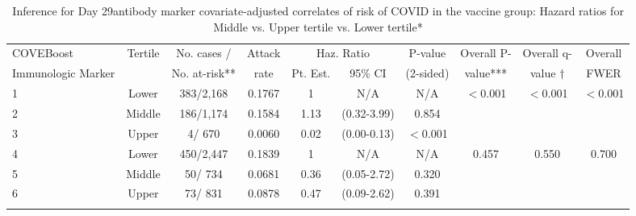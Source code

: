 \begin{longtable}{lccccccccc}
\caption{Inference for Day 29antibody marker covariate-adjusted correlates of risk of COVID in the vaccine group: Hazard ratios for Middle vs. Upper tertile vs. Lower tertile*} \\ 
   \hline
 
         \multicolumn{1}{l}{COVEBoost} & \multicolumn{1}{c}{Tertile}   & \multicolumn{1}{c}{No. cases /}   & \multicolumn{1}{c}{Attack}   & \multicolumn{2}{c}{Haz. Ratio}                     & \multicolumn{1}{c}{P-value}   & \multicolumn{1}{c}{Overall P-}      & \multicolumn{1}{c}{Overall q-}   & \multicolumn{1}{c}{Overall} \\ 
         \multicolumn{1}{l}{Immunologic Marker}            & \multicolumn{1}{c}{}          & \multicolumn{1}{c}{No. at-risk**} & \multicolumn{1}{c}{rate}   & \multicolumn{1}{c}{Pt. Est.} & \multicolumn{1}{c}{95\% CI} & \multicolumn{1}{c}{(2-sided)} & \multicolumn{1}{c}{value***} & \multicolumn{1}{c}{value $\dagger$} & \multicolumn{1}{c}{FWER} \\ 
         \hline
 
    1 & Lower & 383/2,168 & 0.1767 & 1 & N/A & N/A & $<$0.001 & $<$0.001 & $<$0.001 \\ 
  2 & Middle & 186/1,174 & 0.1584 & 1.13 & (0.32-3.99) & 0.854 &     &  &  \\ 
  3 & Upper & 4/  670 & 0.0060 & 0.02 & (0.00-0.13) & $<$0.001 &     &  &  \\ 
  4 & Lower & 450/2,447 & 0.1839 & 1 & N/A & N/A & 0.457 & 0.550 & 0.700 \\ 
  5 & Middle & 50/  734 & 0.0681 & 0.36 & (0.05-2.72) & 0.320 &     &  &  \\ 
  6 & Upper & 73/  831 & 0.0878 & 0.47 & (0.09-2.62) & 0.391 &     &  &  \\ 
   \hline
\hline
\label{tab:CoR_univariable_svycoxph_cat_pretty}
\end{longtable}
